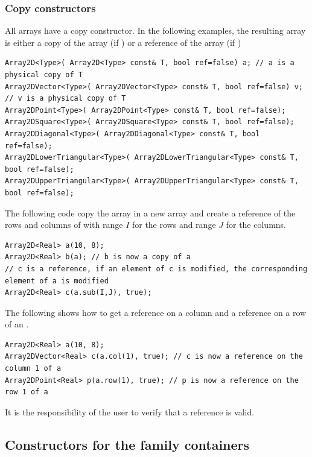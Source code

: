 \documentclass[a4paper,10pt]{article}
\begin{document}
\subsubsection{Copy constructors}
All arrays have a copy constructor. In the following examples, the resulting array is either a
copy of the array  (if ) or a reference of the array   (if )
\begin{lstlisting}[style=customcpp]
Array2D<Type>( Array2D<Type> const& T, bool ref=false) a; // a is a physical copy of T
Array2DVector<Type>( Array2DVector<Type> const& T, bool ref=false) v;  // v is a physical copy of T
Array2DPoint<Type>( Array2DPoint<Type> const& T, bool ref=false);
Array2DSquare<Type>( Array2DSquare<Type> const& T, bool ref=false);
Array2DDiagonal<Type>( Array2DDiagonal<Type> const& T, bool ref=false);
Array2DLowerTriangular<Type>( Array2DLowerTriangular<Type> const& T, bool ref=false);
Array2DUpperTriangular<Type>( Array2DUpperTriangular<Type> const& T, bool ref=false);
\end{lstlisting}

The following code copy the array  in a new array  and create a
reference of the rows and columns of  with range $I$ for the rows and
range $J$ for the columns.
\begin{lstlisting}[style=customcpp]
Array2D<Real> a(10, 8);
Array2D<Real> b(a); // b is now a copy of a
// c is a reference, if an element of c is modified, the corresponding element of a is modified
Array2D<Real> c(a.sub(I,J), true);
\end{lstlisting}

The following shows how to get a reference on a column and a reference on a row of an .
\begin{lstlisting}[style=customcpp]
Array2D<Real> a(10, 8);
Array2DVector<Real> c(a.col(1), true); // c is now a reference on the column 1 of a
Array2DPoint<Real> p(a.row(1), true); // p is now a reference on the row 1 of a
\end{lstlisting}

\begin{warning}
It is the responsibility of the user to verify that a reference is valid.
\end{warning}

\subsection{Constructors for the  family containers}
\end{document}
